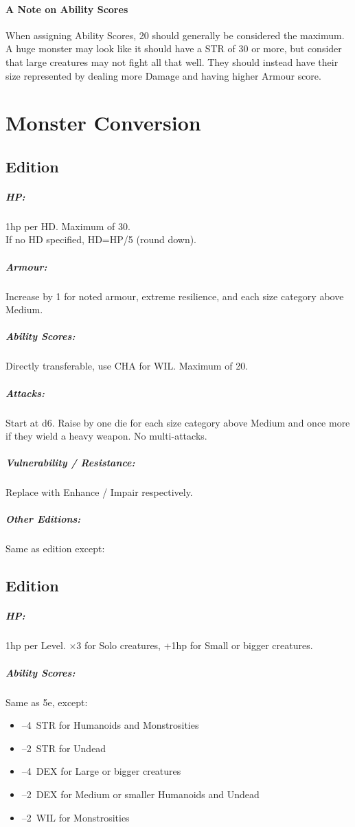 \documentclass[itdr]{subfiles}
\begin{document}
\vfill
{}
\paragraph{A Note on Ability Scores}
When assigning Ability Scores, 20 should generally be considered the maximum. A huge monster may look like it should have a STR of 30 or more, but consider that large creatures may not fight all that well. They should instead have their size represented by dealing more Damage and having higher Armour score.

\vfill
\break

\section{Monster Conversion}

\subsection*{ Edition}

\subparagraph{HP:} 1hp per HD. Maximum of 30.\\If no HD specified, HD=HP/5 (round down).
\subparagraph{Armour:} Increase by 1 for noted armour, extreme resilience, and each size category above Medium.
\subparagraph{Ability Scores:} Directly transferable, use CHA for WIL. Maximum of 20.
\subparagraph{Attacks:} Start at d6. Raise by one die for each size category above Medium and once more if they wield a heavy weapon. No multi-attacks.
\subparagraph{Vulnerability / Resistance:} Replace with Enhance / Impair respectively.

\vfill

\subparagraph{Other Editions:} Same as  edition except:
\subsection*{ Edition}
\subparagraph{HP:} 1hp per Level. $\times$3 for Solo creatures, +1hp for Small or bigger creatures.
\subparagraph{Ability Scores:} Same as 5e, except:
\begin{itemize}
	\item --4~STR for Humanoids and Monstrosities
	\item --2~STR for Undead
	\item --4~DEX for Large or bigger creatures
	\item --2~DEX for Medium or smaller Humanoids and Undead
	\item --2~WIL for Monstrosities
\end{itemize}
\end{document}
